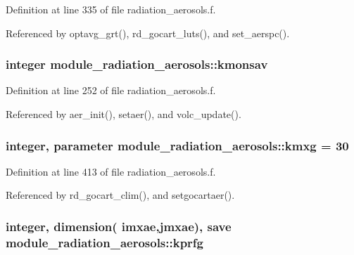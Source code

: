Definition at line 335 of file radiation\+\_\+aerosols.\+f.



Referenced by optavg\+\_\+grt(), rd\+\_\+gocart\+\_\+luts(), and set\+\_\+aerspc().

\subsubsection[{\texorpdfstring{kmonsav}{kmonsav}}]{\setlength{\rightskip}{0pt plus 5cm}integer module\+\_\+radiation\+\_\+aerosols\+::kmonsav\hspace{0.3cm}{\ttfamily [private]}}\hypertarget{group__module__radiation__aerosols_ga302ae8a5aa2b8fb08ad366ef124cee45}{}\label{group__module__radiation__aerosols_ga302ae8a5aa2b8fb08ad366ef124cee45}


Definition at line 252 of file radiation\+\_\+aerosols.\+f.



Referenced by aer\+\_\+init(), setaer(), and volc\+\_\+update().

\subsubsection[{\texorpdfstring{kmxg}{kmxg}}]{\setlength{\rightskip}{0pt plus 5cm}integer, parameter module\+\_\+radiation\+\_\+aerosols\+::kmxg = 30\hspace{0.3cm}{\ttfamily [private]}}\hypertarget{group__module__radiation__aerosols_ga5339e589d92fab8cbb310b84b6ca3d9e}{}\label{group__module__radiation__aerosols_ga5339e589d92fab8cbb310b84b6ca3d9e}


Definition at line 413 of file radiation\+\_\+aerosols.\+f.



Referenced by rd\+\_\+gocart\+\_\+clim(), and setgocartaer().

\subsubsection[{\texorpdfstring{kprfg}{kprfg}}]{\setlength{\rightskip}{0pt plus 5cm}integer, dimension(    imxae,jmxae), save module\+\_\+radiation\+\_\+aerosols\+::kprfg\hspace{0.3cm}{\ttfamily [private]}}\hypertarget{group__module__radiation__aerosols_ga28df10ba381278cc7474bea0bfdaa870}{}\label{group__module__radiation__aerosols_ga28df10ba381278cc7474bea0bfdaa870}


